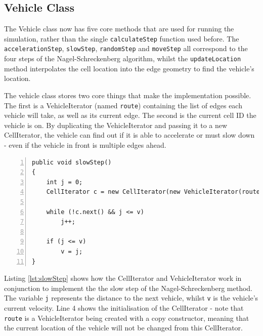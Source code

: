 \documentclass[ %
                    author={Alexander Hill},
                supervisor={Dr. Benjamin Sach},
                    degree={MEng},
                     title={MARMOSET},
                  subtitle={Multi-Agent Route Management using Online Simulation for Efficient Transportation},
                      type={research},
                      year={2016} ]{dissertation}
\begin{document}

\subsection{Vehicle Class}

The Vehicle class now has five core methods that are used for running the
simulation, rather than the single \texttt{calculateStep} function used before.
The \texttt{accelerationStep}, \texttt{slowStep}, \texttt{randomStep} and
\texttt{moveStep} all correspond to the four steps of the Nagel-Schreckenberg
algorithm, whilst the \texttt{updateLocation} method interpolates the cell
location into the edge geometry to find the vehicle's location.

The vehicle class stores two core things that make the implementation possible.
The first is a VehicleIterator (named \texttt{route}) containing the list of
edges each vehicle will take, as well as its current edge. The second is the
current cell ID the vehicle is on. By duplicating the VehicleIterator and
passing it to a new CellIterator, the vehicle can find out if it is able to
accelerate or must slow down - even if the vehicle in front is multiple edges
ahead.

\begin{minipage}{\linewidth}
\begin{lstlisting}[caption={The \texttt{slowStep} implementation making use of the CellIterator},
                    label=lst:slowStep, numbers=left]
public void slowStep()
{
    int j = 0;
    CellIterator c = new CellIterator(new VehicleIterator(route), cg, cellId);

    while (!c.next() && j <= v)
        j++;

    if (j <= v)
        v = j;
}
\end{lstlisting}
\end{minipage}

Listing \ref{lst:slowStep} shows how the CellIterator and VehicleIterator work
in conjunction to implement the the slow step of the Nagel-Schreckenberg method.
The variable \texttt{j} represents the distance to the next vehicle, whilst
\texttt{v} is the vehicle's current velocity. Line 4 shows the initialisation of
the CellIterator - note that \texttt{route} is a VehicleIterator being created
with a copy constructor, meaning that the current location of the vehicle will
not be changed from this CellIterator.
\end{document}
